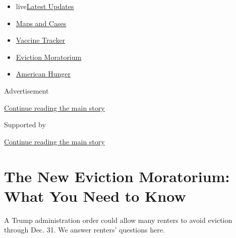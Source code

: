 \begin{itemize}
\tightlist
\item
  live\href{https://www.nytimes3xbfgragh.onion/2020/09/05/world/coronavirus-covid.html?name=styln-coronavirus-national\&region=TOP_BANNER\&block=storyline_menu_recirc\&action=click\&pgtype=Article\&impression_id=45692b91-efb9-11ea-99c0-252aeb508ca6\&variant=undefined}{Latest
  Updates}
\item
  \href{https://www.nytimes3xbfgragh.onion/interactive/2020/us/coronavirus-us-cases.html?name=styln-coronavirus-national\&region=TOP_BANNER\&block=storyline_menu_recirc\&action=click\&pgtype=Article\&impression_id=45692b92-efb9-11ea-99c0-252aeb508ca6\&variant=undefined}{Maps
  and Cases}
\item
  \href{https://www.nytimes3xbfgragh.onion/interactive/2020/science/coronavirus-vaccine-tracker.html?name=styln-coronavirus-national\&region=TOP_BANNER\&block=storyline_menu_recirc\&action=click\&pgtype=Article\&impression_id=456952a0-efb9-11ea-99c0-252aeb508ca6\&variant=undefined}{Vaccine
  Tracker}
\item
  \href{https://www.nytimes3xbfgragh.onion/2020/09/02/your-money/eviction-moratorium-covid.html?name=styln-coronavirus-national\&region=TOP_BANNER\&block=storyline_menu_recirc\&action=click\&pgtype=Article\&impression_id=456952a1-efb9-11ea-99c0-252aeb508ca6\&variant=undefined}{Eviction
  Moratorium}
\item
  \href{https://www.nytimes3xbfgragh.onion/interactive/2020/09/02/magazine/food-insecurity-hunger-us.html?name=styln-coronavirus-national\&region=TOP_BANNER\&block=storyline_menu_recirc\&action=click\&pgtype=Article\&impression_id=456952a2-efb9-11ea-99c0-252aeb508ca6\&variant=undefined}{American
  Hunger}
\end{itemize}

Advertisement

\protect\hyperlink{after-top}{Continue reading the main story}

Supported by

\protect\hyperlink{after-sponsor}{Continue reading the main story}

\hypertarget{the-new-eviction-moratorium-what-you-need-to-know}{%
\section{The New Eviction Moratorium: What You Need to
Know}\label{the-new-eviction-moratorium-what-you-need-to-know}}

A Trump administration order could allow many renters to avoid eviction
through Dec. 31. We answer renters' questions here.

